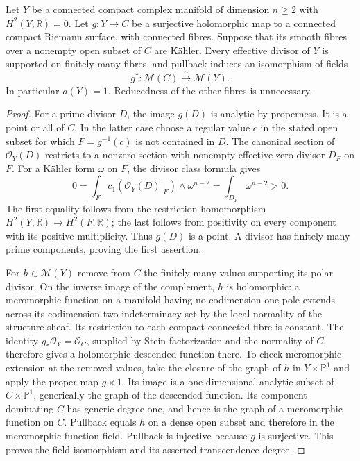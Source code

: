 
\label{cdp:sec:E}

\begin{proposition}\label{cdp:st:E1}
Let $Y$ be a connected compact complex manifold of dimension $n\geq2$
with $H^2(Y,\mathbb R)=0$. Let $g:Y\to C$ be a surjective holomorphic
map to a connected compact Riemann surface, with connected fibres.
Suppose that its smooth fibres over a nonempty open subset of $C$ are
K\"ahler. Every effective divisor of $Y$ is supported on finitely many
fibres, and pullback induces an isomorphism of fields
\[
 g^*: \mathcal M(C)\xrightarrow{\ \sim\ }\mathcal M(Y).
\]
In particular $a(Y)=1$. Reducedness of the other fibres is unnecessary.
\end{proposition}
\begin{proof}
For a prime divisor $D$, the image $g(D)$ is analytic by properness. It
is a point or all of $C$. In the latter case choose a regular value $c$
in the stated open subset for which $F=g^{-1}(c)$ is not contained in
$D$. The canonical section of $\mathcal O_Y(D)$ restricts to a nonzero
section with nonempty effective zero divisor $D_F$ on $F$. For a
K\"ahler form $\omega$ on $F$, the divisor class formula gives
\[
 0=\int_F c_1(\mathcal O_Y(D)|_F)\wedge\omega^{n-2}
   =\int_{D_F}\omega^{n-2}>0.
\]
The first equality follows from the restriction homomorphism
$H^2(Y,\mathbb R)\to H^2(F,\mathbb R)$; the last follows from positivity
on every component with its positive multiplicity. Thus $g(D)$ is a
point. A divisor has finitely many prime components, proving the first
assertion.

For $h\in\mathcal M(Y)$ remove from $C$ the finitely many values
supporting its polar divisor. On the inverse image of the complement,
$h$ is holomorphic: a meromorphic function on a manifold having no
codimension-one pole extends across its codimension-two indeterminacy
set by the local normality of the structure sheaf. Its restriction to
each compact connected fibre is constant. The identity
$g_*\mathcal O_Y=\mathcal O_C$, supplied by Stein factorization and
the normality of $C$, therefore gives a holomorphic descended function
there. To check meromorphic extension at the removed values, take the
closure of the graph of $h$ in $Y\times\mathbb P^1$ and apply the proper
map $g\times1$. Its image is a one-dimensional analytic subset of
$C\times\mathbb P^1$, generically the graph of the descended function.
Its component dominating $C$ has generic degree one, and hence is the
graph of a meromorphic function on $C$. Pullback equals $h$ on a dense
open subset and therefore in the meromorphic function field. Pullback
is injective because $g$ is surjective. This proves the field
isomorphism and its asserted transcendence degree.
\end{proof}


